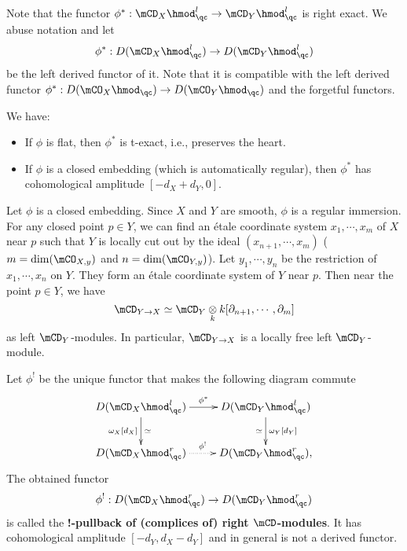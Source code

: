 	\begin{constr}
		Note that the functor $\phi^*: \mCD_X\hmod^l_\qc\to \mCD_Y\hmod^l_\qc$ is right exact. We abuse notation and let
		\[
			\phi^*: D(\mCD_X\hmod^l_\qc) \to D(\mCD_Y\hmod^l_\qc)
		\]
		be the left derived functor of it. Note that it is compatible with the left derived functor $\phi^*: D(\mCO_X\hmod_\qc) \to D(\mCO_Y\hmod_\qc)$ and the forgetful functors.
	\end{constr}

	\begin{rem}
		We have:
		\begin{itemize}
			\item If $\phi$ is flat, then $\phi^*$ is t-exact, i.e., preserves the heart.
			\item If $\phi$ is a closed embedding (which is automatically regular), then $\phi^*$ has cohomological amplitude $[-d_X+d_Y,0]$.
		\end{itemize}
	\end{rem}

	\begin{exam}
		Let $\phi$ is a closed embedding. Since $X$ and $Y$ are smooth, $\phi$ is a regular immersion. For any closed point $p\in Y$, we can find an étale coordinate system $x_1,\cdots,x_m$ of $X$ near $p$ such that $Y$ is locally cut out by the ideal $(x_{n+1},\cdots,x_m)$ ($m=\dim(\mCO_{X,y})$ and $n=\dim(\mCO_{Y,y})$). Let $y_1,\cdots,y_n$ be the restriction of $x_1,\cdots,x_n$ on $Y$. They form an étale coordinate system of $Y$ near $p$. Then near the point $p\in Y$, we have
		\[
			\mCD_{Y\to X} \simeq \mCD_Y\ot_k k[ \partial_{n+1},\cdots,\partial_m ]
		\]
		as left $\mCD_Y$-modules. In particular, $\mCD_{Y\to X}$ is a locally free left $\mCD_Y$-module.

		
	\end{exam}

	\begin{constr}
		Let $\phi^!$ be the unique functor that makes the following diagram commute
		\[
			\xymatrix{
				D(\mCD_X\hmod^l_\qc) \ar[r]^-{\phi^*} \ar[d]_-{\omega_X[d_X]}^-\simeq &
				D(\mCD_Y\hmod^l_\qc) \ar[d]^-{\omega_Y[d_Y]}_-\simeq \\
				D(\mCD_X\hmod^r_\qc) \ar@{.>}[r]^-{\phi^!} &
				D(\mCD_Y\hmod^r_\qc),
			}
		\]
	 	The obtained functor
		\[
			\phi^!: D(\mCD_X\hmod^r_\qc) \to D(\mCD_Y\hmod^r_\qc)
		\]
		is called the \textbf{!-pullback of (complices of) right $\mCD$-modules}. It has cohomological amplitude $[-d_Y, d_X-d_Y]$ and in general is not a derived functor.
	\end{constr}

